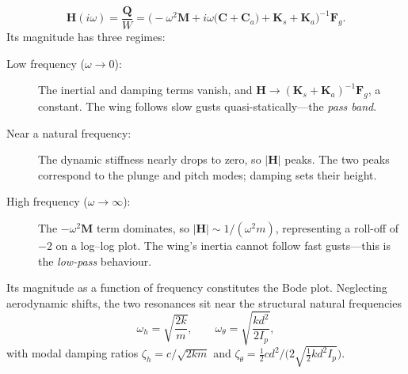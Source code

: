 \documentclass[11pt]{article}
\begin{document}
\begin{equation}
\boxed{\ \mathbf H(i\omega) = \frac{\mathbf Q}{W}
= \big(-\omega^2\mathbf M + i\omega\big(\mathbf C + \mathbf C_a\big) + \mathbf K_s + \mathbf K_a\big)^{-1}
\mathbf F_g .\ }
\label{eq:H}
\end{equation}
Its magnitude has three regimes:
\begin{description}
\item[Low frequency ($\omega\!\to\!0$):] The inertial and damping terms vanish,
and $\mathbf H\to(\mathbf K_s+\mathbf K_a)^{-1}\mathbf F_g$, a constant. The wing
follows slow gusts quasi-statically---the \emph{pass band}.
\item[Near a natural frequency:] The dynamic stiffness nearly drops to zero, so
$|\mathbf H|$ peaks. The two peaks correspond to the plunge and pitch modes;
damping sets their height.
\item[High frequency ($\omega\!\to\!\infty$):] The $-\omega^2\mathbf M$ term
dominates, so $|\mathbf H|\sim 1/(\omega^2 m)$, representing a roll-off of $-2$ on a log--log
plot. The wing's inertia cannot follow fast gusts---this is the \emph{low-pass}
behaviour.
\end{description}
Its magnitude as a function of frequency constitutes the Bode plot. Neglecting aerodynamic shifts, the two
resonances sit near the structural natural frequencies
\begin{equation}
\omega_h=\sqrt{\frac{2k}{m}},\qquad
\omega_\theta=\sqrt{\frac{k d^2}{2 I_p}},
\label{eq:wn}
\end{equation}
with modal damping ratios $\zeta_h=c/\sqrt{2km}$ and
$\zeta_\theta=\tfrac12 c d^2/\big(2\sqrt{\tfrac12 k d^2 I_p}\big)$.

\end{document}
